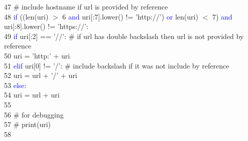 47	 \hspace*{5mm}        \hspace*{10mm}\# include hostname if url is provided by reference\\
48	 \hspace*{5mm}        \hspace*{10mm}\textcolor{blue}{if} ((len(uri) $>$ 6 \textcolor{blue}{and} uri[:7].lower() $!$= 'http://') \textcolor{blue}{or} len(uri) $<$ 7) \textcolor{blue}{and} \\
\hspace*{25mm} uri[:8].lower() $!$= 'https://':\\
49	 \hspace*{5mm}            \hspace*{15mm}\textcolor{blue}{if} uri[:2] == '//':    \hspace*{5mm}\# if url has double backslash then url is not provided by reference\\
50	 \hspace*{5mm}                \hspace*{20mm}uri = 'http:' + uri\\
51	 \hspace*{5mm}            \hspace*{15mm}\textcolor{blue}{elif} uri[0] $!$= '/':    \hspace*{5mm}\# include backslash if it was not include by reference\\
52	 \hspace*{5mm}                \hspace*{20mm}uri = url + '/' + uri\\
53	 \hspace*{5mm}            \hspace*{15mm}\textcolor{blue}{else}:\\
54	 \hspace*{5mm}                \hspace*{20mm}uri = url + uri\\
55	 \hspace*{5mm}\\
56	 \hspace*{5mm}        \hspace*{10mm}\# for debugging\\
57	 \hspace*{5mm}        \hspace*{10mm}\# print(uri)\\
58	 \hspace*{5mm}\\
